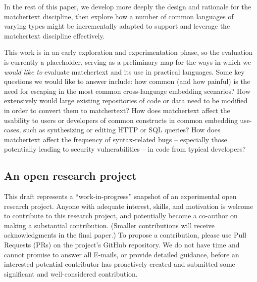 In the rest of this paper, 
we develop more deeply the design and rationale for the matchertext discipline,
then explore how a number of common languages of varying types
might be incrementally adapted to support and leverage
the matchertext discipline effectively.

This work is in an early exploration and experimentation phase,
so the evaluation is currently a placeholder,
serving as a preliminary map for the ways in which
we \emph{would like to} evaluate matchertext
and its use in practical languages.
Some key questions we would like to answer include:
how common (and how painful) is the need for escaping
in the most common cross-language embedding scenarios?
How extensively would large existing repositories of code or data
need to be modified in order to convert them to matchertext?
How does matchertext affect the usability to users or developers
of common constructs in common embedding use-cases,
such as synthesizing or editing HTTP or SQL queries?
How does matchertext affect the frequency of syntax-related bugs --
especially those potentially leading to security vulnerabilities --
in code from typical developers?





\subsection*{An open research project}

This draft represents a ``work-in-progress'' snapshot
of an experimental open research project.
Anyone with adequate interest, skills, and motivation
is welcome to contribute to this research project,
and potentially become a co-author on making a substantial contribution.
(Smaller contributions will receive acknowledgments in the final paper.)
To propose a contribution, please use Pull Requests (PRs)
on the project's GitHub repository.
We do not have time and cannot promise to answer all E-mails,
or provide detailed guidance,
before an interested potential contributor has proactively
created and submitted some significant and well-considered contribution.

